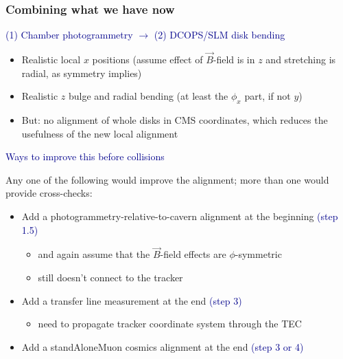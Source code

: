 \documentclass[compress]{beamer}
\begin{document}
\begin{frame}
\frametitle{Combining what we have now}

\textcolor{darkblue}{(1) Chamber photogrammetry $\to$ (2) DCOPS/SLM disk bending}
\begin{itemize}
\item Realistic local $x$ positions (assume effect of $\vec{B}$-field is in $z$ and stretching is radial, as symmetry implies)
\item Realistic $z$ bulge and radial bending (at least the $\phi_x$ part, if not $y$)
\item But: no alignment of whole disks in CMS coordinates, which reduces the usefulness of the new local alignment
\end{itemize}

\vspace{0.2 cm}
\hspace{-0.83 cm} \textcolor{darkblue}{\Large Ways to improve this before collisions}

\vspace{0.1 cm}
Any one of the following would improve the alignment; more than one would provide cross-checks:

\begin{itemize}
\item Add a photogrammetry-relative-to-cavern alignment at the beginning \textcolor{darkblue}{(step 1.5)}
\begin{itemize}
\item and again assume that the $\vec{B}$-field effects are $\phi$-symmetric
\item still doesn't connect to the tracker
\end{itemize}
\item Add a transfer line measurement at the end \textcolor{darkblue}{(step 3)}
\begin{itemize}
\item need to propagate tracker coordinate system through the TEC
\end{itemize}
\item Add a standAloneMuon cosmics alignment at the end \textcolor{darkblue}{(step 3 or 4)}
\end{itemize}
\end{frame}
\end{document}
